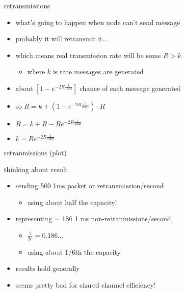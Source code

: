 \begin{frame}{retransmissions}
    \begin{itemize}
    \item what's going to happen when node can't send message
    \item probably it will retransmit it\ldots
    \vspace{.5cm}
    \item which means real transmission rate will be some $R > k$
        \begin{itemize}
        \item where $k$ is rate messages are generated
        \end{itemize}
    \item about $[1-e^{-2R\frac{1}{1000}}]$ chance of each message generated
    \item so $R = k + \left(1-e^{-2R\frac{1}{1000}}\right) \cdot R$
    \item $R = k + R - Re^{-2R\frac{1}{1000}}$
    \item $k = Re^{-2R\frac{1}{1000}}$
    \end{itemize}
\end{frame}

\begin{frame}{retranmissions (plot)}
\end{frame}

\begin{frame}{thinking about result}
    \begin{itemize}
    \item sending 500 1ms packet or retransmission/second
        \begin{itemize}
        \item using about half the capacity!
        \end{itemize}
    \item representing $\sim$ 186 1 ms non-retranmissions/second
        \begin{itemize}
        \item $\frac{1}{2e} = 0.186\ldots$
        \item using about 1/6th the capacity
        \end{itemize}
    \vspace{.5cm}
    \item results hold generally
    \item seems pretty bad for shared channel efficiency!
    \end{itemize}
\end{frame}

